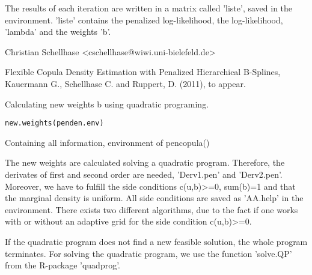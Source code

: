 \documentclass[a4paper]{book}
\begin{document}
%
\begin{Value}
\begin{ldescription}
\item[\code{liste}] The results of each iteration are written in a matrix called 'liste',
saved in the environment. 'liste' contains the penalized
log-likelihood, the log-likelihood, 'lambda' and the weights 'b'.
\end{ldescription}
\end{Value}
%
\begin{Author}\relax
Christian Schellhase <cschellhase@wiwi.uni-bielefeld.de>
\end{Author}
%
\begin{References}\relax
Flexible Copula Density Estimation with Penalized
Hierarchical B-Splines, Kauermann G., Schellhase C. and Ruppert, D. (2011), to appear.
\end{References}
%
\begin{Description}\relax
Calculating new weights b using quadratic programing.
\end{Description}
%
\begin{Usage}
\begin{verbatim}
new.weights(penden.env)
\end{verbatim}
\end{Usage}
%
\begin{Arguments}
\begin{ldescription}
\item[\code{penden.env}] Containing all information, environment of pencopula()
\end{ldescription}
\end{Arguments}
%
\begin{Details}\relax
The new weights are calculated solving a quadratic program. Therefore,
the derivates of first and second order are needed, 'Derv1.pen' and
'Derv2.pen'. Moreover, we have to fulfill the side conditions
c(u,b)>=0, sum(b)=1 and that the marginal density is uniform. All side
conditions are saved as 'AA.help' in the environment. There exists two
different algorithms, due to the fact if one works with or without an
adaptive grid for the side condition c(u,b)>=0.

If the quadratic program does not find a new feasible solution, the whole
program terminates. For solving the quadratic program, we use the
function 'solve.QP' from the  R-package 'quadprog'. 
\end{Details}
\end{document}
